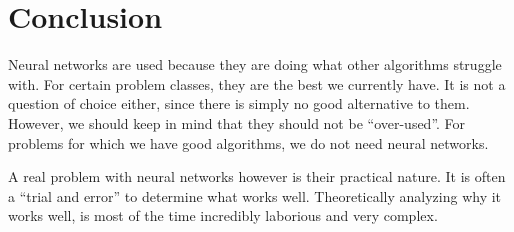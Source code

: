 \section{Conclusion}
\label{sec:conclusion}

Neural networks are used because they are doing what other algorithms struggle with.
For certain problem classes, they are the best we currently have.
It is not a question of choice either, since there is simply no good alternative to them.
However, we should keep in mind that they should not be \enquote{over-used}.
For problems for which we have good algorithms, we do not need neural networks.

A real problem with neural networks however is their practical nature.
It is often a \enquote{trial and error} to determine what works well.
Theoretically analyzing why it works well, is most of the time incredibly laborious and very complex.